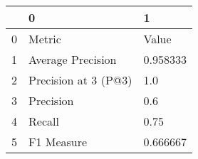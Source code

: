 \begin{tabular}{lll}
\toprule
{} &                     0 &         1 \\
\midrule
0 &                Metric &     Value \\
1 &     Average Precision &  0.958333 \\
2 &  Precision at 3 (P@3) &       1.0 \\
3 &             Precision &       0.6 \\
4 &                Recall &      0.75 \\
5 &            F1 Measure &  0.666667 \\
\bottomrule
\end{tabular}
